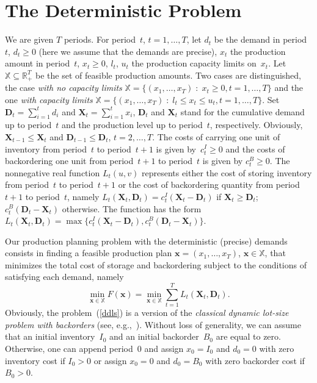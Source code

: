 \documentclass[11pt]{article}
\newcommand{\Rset}{\mathbb{R}}
\newcommand{\Xset}{\mathbb{X}}
\begin{document}
\section{The Deterministic Problem}
\label{sdlsp}


We are given $T$ periods. For period~$t$, $t=1,\ldots,T$,
let $d_t$ be the demand in period~$t$, $d_t\geq 0$
(here we assume that the demands are precise), $x_t$ the production
amount in period~$t$, $x_t\geq 0$, $l_t$, $u_t$ the production capacity limits on~$x_t$. 
Let $\Xset\subseteq \Rset^{T}_{+}$
be the set of feasible production amounts.
Two cases are distinguished, the case
\emph{with no capacity limits} $\Xset=\{(x_1,\ldots,x_{T})\;:\;
x_t\geq 0, t=1,\ldots,T\}$
and the one \emph{with capacity limits}
$\Xset=\{(x_1,\ldots,x_{T})\;:\;
l_t\leq x_t\leq u_t, t=1,\ldots,T\}$.
Set $\mathbf{D}_t=\sum_{i=1}^{t}d_i$ and
 $\mathbf{X}_t=\sum_{i=1}^{t}x_i$,
 $\mathbf{D}_t$ and  $\mathbf{X}_t$ stand for
 the cumulative demand up to period~$t$
and  the production level up to period~$t$, respectively.
Obviously, $\mathbf{X}_{t-1}\leq \mathbf{X}_t$ and 
$\mathbf{D}_{t-1}\leq \mathbf{D}_t$, $t=2,\ldots,T$.
The costs of carrying one unit of 
inventory from period~$t$ to period~$t+1$ is given by~$c^I_t\geq 0$
and
the costs of backordering one unit 
from period~$t+1$ to period~$t$ is given by $c^B_t\geq 0$. 
The nonnegative real function $L_t(u,v)$ represents either the cost of storing inventory 
from period~$t$ to period~$t+1$
or  the cost of backordering quantity from period~$t+1$ to
period~$t$,
namely
$L_t(\mathbf{X}_t,\mathbf{D}_t)=c^I_t(\mathbf{X}_t-\mathbf{D}_t)$
if $\mathbf{X}_t\geq \mathbf{D}_t$; $c^{B}_t(\mathbf{D}_t-\mathbf{X}_t)$ otherwise.
The function has the form 
$L_t(\mathbf{X}_t,\mathbf{D}_t)=\max\{c^{I}_t(\mathbf{X}_t-\mathbf{D}_t),
c^{B}_t(\mathbf{D}_t-\mathbf{X}_t)\}$.


Our production planning problem with the deterministic (precise) demands consists in
finding a feasible production plan  $\pmb{x}=(x_1,\ldots,x_{T})$,
$\pmb{x}\in \Xset$, that  minimizes the total cost of
storage and backordering subject to the conditions of satisfying each demand, namely
\begin{equation}
\min_{\pmb{x}\in \Xset}F(\pmb{x})=
\min_{\pmb{x}\in \Xset}\sum_{t=1}^{T}L_t(\mathbf{X}_t,\mathbf{D}_t).
\label{ddls}
\end{equation}
Obviously, the problem~(\ref{ddls}) is a version of the \emph{classical
dynamic lot-size problem with backorders} (see, e.g.,~\cite{WW58,FLK80}).
 Without loss of generality, we can assume that
an initial inventory~$I_0$ and an initial backorder~$B_0$
are equal to zero. Otherwise, one can append period~$0$
and assign $x_0=I_0$ and $d_0=0$ 
with zero inventory cost  
if $I_0>0$ or 
assign $x_0=0$ and $d_0=B_0$
with zero backorder cost
if $B_0>0$. 
\end{document}
